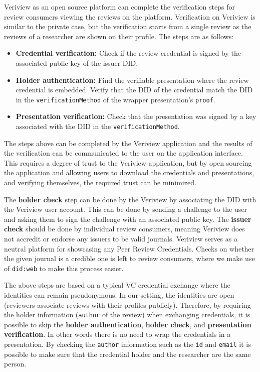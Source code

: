 Veriview as an open source platform can complete the verification steps for review consumers viewing the reviews on the platform. Verification on Veriview is similar to the private case, but the verification starts from a single review as the reviews of a researcher are shown on their profile. The steps are as follows:

\begin{itemize}

    \item \textbf{Credential verification:} Check if the review credential is signed by the associated public key of the issuer \acrshort{DID}.
    
    \item \textbf{Holder authentication:} Find the verifiable presentation where the review credential is embedded. Verify that the \acrshort{DID} of the credential match the \acrshort{DID} in the \lstinline{verificationMethod} of the wrapper presentation's \lstinline{proof}.
    
    \item \textbf{Presentation verification:} Check that the presentation was signed by a key associated with the \acrshort{DID} in the \lstinline{verificationMethod}.

\end{itemize}

The steps above can be completed by the Veriview application and the results of the verification can be communicated to the user on the application interface. This requires a degree of trust to the Veriview application, but by open sourcing the application and allowing users to download the credentials and presentations, and verifying themselves, the required trust can be minimized. 

The \textbf{holder check} step can be done by the Veriview by associating the \acrshort{DID} with the Veriview user account. This can be done by sending a challenge to the user and asking them to sign the challenge with an associated public key. The \textbf{issuer check} should be done by individual review consumers, meaning Veriview does not accredit or endorse any issuers to be valid journals. Veriview serves as a neutral platform for showcasing any Peer Review Credentials. Checks on whether the given journal is a credible one is left to review consumers, where we make use of \lstinline{did:web} to make this process easier.

The above steps are based on a typical \acrlong{VC} credential exchange where the identities can remain pseudonymous. In our setting, the identities are open (reviewers associate reviews with their profiles publicly). Therefore, by requiring the holder information (\lstinline{author} of the review) when exchanging credentials, it is possible to skip the \textbf{holder authentication}, \textbf{holder check}, and \textbf{presentation verification}. In other words there is no need to wrap the credentials in a presentation. By checking the \lstinline{author} information such as the \lstinline{id} and \lstinline{email} it is possible to make sure that the credential holder and the researcher are the same person.

